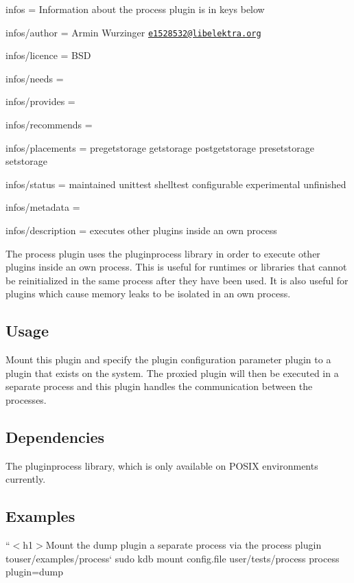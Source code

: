 
\begin{DoxyItemize}
\item infos = Information about the process plugin is in keys below
\item infos/author = Armin Wurzinger \href{mailto:e1528532@libelektra.org}{\tt e1528532@libelektra.\+org}
\item infos/licence = B\+SD
\item infos/needs =
\item infos/provides =
\item infos/recommends =
\item infos/placements = pregetstorage getstorage postgetstorage presetstorage setstorage
\item infos/status = maintained unittest shelltest configurable experimental unfinished
\item infos/metadata =
\item infos/description = executes other plugins inside an own process
\end{DoxyItemize}

The process plugin uses the {\ttfamily pluginprocess} library in order to execute other plugins inside an own process. This is useful for runtimes or libraries that cannot be reinitialized in the same process after they have been used. It is also useful for plugins which cause memory leaks to be isolated in an own process.

\subsection*{Usage}

Mount this plugin and specify the plugin configuration parameter {\ttfamily plugin} to a plugin that exists on the system. The proxied plugin will then be executed in a separate process and this plugin handles the communication between the processes.

\subsection*{Dependencies}

The {\ttfamily pluginprocess} library, which is only available on P\+O\+S\+IX environments currently.

\subsection*{Examples}

``{\ttfamily  $<$h1$>$Mount the dump plugin a separate process via the process plugin to}user/examples/process` sudo kdb mount config.\+file user/tests/process process plugin=dump

